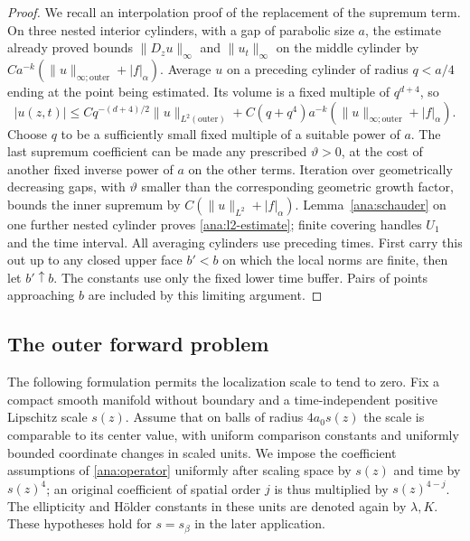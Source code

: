 \begin{proof}
We recall an interpolation proof of the replacement of the supremum
term.  On three nested interior cylinders, with a gap of parabolic
size $a$, the estimate already proved bounds $\|D_zu\|_\infty$
and $\|u_t\|_\infty$ on the middle cylinder by
$Ca^{-k}(\|u\|_{\infty;\mathrm{outer}}+|f|_\alpha)$.
Average $u$ on a preceding cylinder of radius $q<a/4$ ending at
the point being estimated.  Its volume is a fixed multiple of
$q^{d+4}$, so
\[
 |u(z,t)|\le Cq^{-(d+4)/2}\|u\|_{L^2(\mathrm{outer})}
           +C(q+q^4)a^{-k}
                    (\|u\|_{\infty;\mathrm{outer}}+|f|_\alpha).
\]
Choose $q$ to be a sufficiently small fixed multiple of a suitable
power of $a$.  The last supremum coefficient can be made any
prescribed $\vartheta>0$, at the cost of another fixed inverse
power of $a$ on the other terms.  Iteration over geometrically
decreasing gaps, with $\vartheta$ smaller than the corresponding
geometric growth factor, bounds the inner supremum by
$C(\|u\|_{L^2}+|f|_\alpha)$.  Lemma~\ref{ana:schauder} on one
further nested cylinder proves \eqref{ana:l2-estimate}; finite
covering handles $U_1$ and the time interval.  All averaging
cylinders use preceding times.  First carry this out up to any
closed upper face $b'<b$ on which the local norms are finite,
then let $b'\uparrow b$.  The constants use only the fixed lower
time buffer.  Pairs of points approaching $b$ are included by
this limiting argument.
\end{proof}

\subsection{The outer forward problem}

The following formulation permits the localization scale to tend
to zero.  Fix a compact smooth manifold without boundary and a
time-independent positive Lipschitz scale $s(z)$.  Assume that on
balls of radius $4a_0s(z)$ the scale is comparable to its center
value, with uniform comparison constants and uniformly bounded
coordinate changes in scaled units.  We impose the coefficient
assumptions of \eqref{ana:operator} uniformly after scaling space
by $s(z)$ and time by $s(z)^4$; an original coefficient of spatial
order $j$ is thus multiplied by $s(z)^{4-j}$.  The ellipticity and
H\"older constants in these units are denoted again by $\lambda,K$.
These hypotheses hold for $s=s_\beta$ in the later application.


